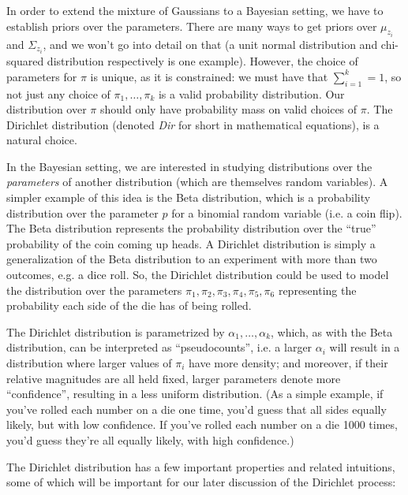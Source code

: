 In order to extend the mixture of Gaussians to a Bayesian setting, we have to establish priors over the parameters. There are many ways to get priors over $\mu_{z_i}$ and $\Sigma_{z_i}$, and we won't go into detail on that (a unit normal distribution and chi-squared distribution respectively is one example). However, the choice of parameters for $\pi$ is unique, as it is constrained: we must have that $\sum_{i = 1}^k = 1$, so not just any choice of $\pi_1, \ldots, \pi_k$ is a valid probability distribution. Our distribution over $\pi$ should only have probability mass on valid choices of $\pi$. The Dirichlet distribution (denoted \textit{Dir} for short in mathematical equations), is a natural choice.

In the Bayesian setting, we are interested in studying distributions over the \textit{parameters} of another distribution (which are themselves random variables). A simpler example of this idea is the Beta distribution, which is a probability distribution over the parameter $p$ for a binomial random variable (i.e. a coin flip). The Beta distribution represents the probability distribution over the ``true'' probability of the coin coming up heads. A Dirichlet distribution is simply a generalization of the Beta distribution to an experiment with more than two outcomes, e.g. a dice roll. So, the Dirichlet distribution could be used to model the distribution over the parameters $\pi_1, \pi_2, \pi_3, \pi_4, \pi_5, \pi_6$ representing the probability each side of the die has of being rolled.

The Dirichlet distribution is parametrized by $\alpha_1, \ldots, \alpha_k$, which, as with the Beta distribution, can be interpreted as ``pseudocounts'', i.e. a larger $\alpha_i$ will result in a distribution where larger values of $\pi_i$ have more density; and moreover, if their relative magnitudes are all held fixed, larger parameters denote more ``confidence'', resulting in a less uniform distribution. (As a simple example, if you've rolled each number on a die one time, you'd guess that all sides equally likely, but with low confidence. If you've rolled each number on a die 1000 times, you'd guess they're all equally likely, with high confidence.)

The Dirichlet distribution has a few important properties and related intuitions, some of which will be important for our later discussion of the Dirichlet process:

